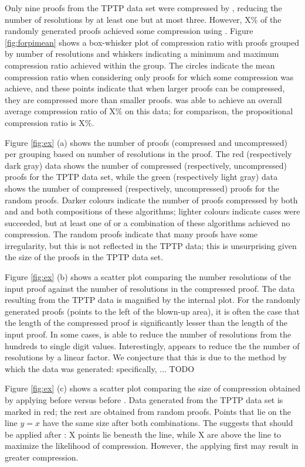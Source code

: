 {Only nine proofs from the TPTP data set were compressed by {\FORPI}, reducing the number of resolutions by at least one but at most three. However, X\% of the randomly generated proofs achieved some compression using {\FORPI}.
Figure \ref{fig:forpimean} shows a box-whisker plot of compression ratio with proofs grouped by number of resolutions and whiskers indicating a minimum and maximum compression ratio achieved within the group. The circles indicate the mean compression ratio when considering only proofs for which some compression was achieve, and these points indicate that when larger proofs can be compressed, they are compressed more than smaller proofs.
{\FORPI} was able to achieve an overall average compression ratio of X\% on this data; for comparison, the propositional {\RPI} compression ratio is X\%.

Figure \ref{fig:ex} (a) shows the number of proofs (compressed and uncompressed) per grouping based on number of resolutions in the proof. The red (respectively dark gray) data shows the number of compressed (respectively, uncompressed) proofs for the TPTP data set, while the green (respectively light gray) data shows the number of compressed (respectively, uncompressed) proofs for the random proofs. Darker colours indicate the number of proofs compressed by both {\FORPI} and {\GFOLU} and both compositions of these algorithms; lighter colours indicate cases were {\FORPI} succeeded, but at least one of {\GFOLU} or a combination of these algorithms achieved no compression. The random proofs indicate that many proofs have some irregularity, but this is not reflected in the TPTP data; this is unsurprising given the size of the proofs in the TPTP data set.

Figure \ref{fig:ex} (b) shows a scatter plot comparing the number resolutions of the input proof against the number of resolutions in the compressed proof. The data resulting from the TPTP data is magnified by the internal plot. For the randomly generated proofs (points to the left of the blown-up area), it is often the case that the length of the compressed proof is significantly lesser than the length of the input proof. In some cases, {\FORPI} is able to reduce the number of resolutions from the hundreds to single digit values. Interestingly, {\GFOLU} appears to reduce the the number of resolutions by a linear factor. We conjecture that this is due to the method by which the data was generated: specifically, ... TODO

Figure \ref{fig:ex} (c) shows a scatter plot comparing the size of compression obtained by applying {\FORPI} before {\GFOLU} versus {\GFOLU} before {\FORPI}. Data generated from the TPTP data set is marked in red; the rest are obtained from random proofs. Points that lie on the line $y=x$ have the same size after both combinations. The suggests that {\FORPI} should be applied after {\GFOLU}: X points lie beneath the line, while X are above the line to maximize the likelihood of compression. However, the applying {\FORPI} first may result in greater compression.

}
